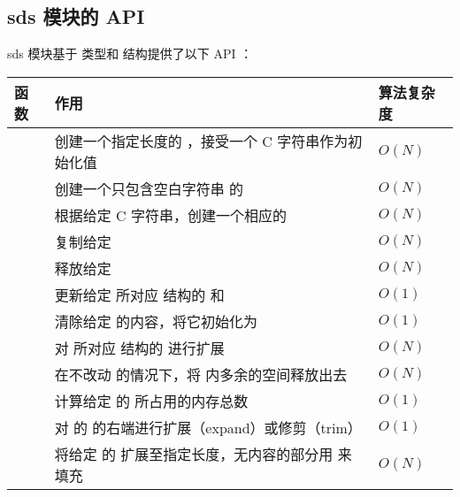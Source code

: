\documentclass[a4paper,11pt,english]{sphinxmanual}
\begin{document}
\subsection{sds 模块的 API}
\label{internal-datastruct/sds:sds-api}
sds 模块基于  类型和  结构提供了以下 API ：

\begin{tabulary}{\linewidth}{|p{3.5cm}|p{8.5cm}|p{2.5cm}|}
\hline
\textbf{
函数
} & \textbf{
作用
} & \textbf{
算法复杂度
}\\\hline

 & 
创建一个指定长度的  ，接受一个 C 字符串作为初始化值
 & 
$O(N)$
\\\hline

 & 
创建一个只包含空白字符串  的 
 & 
$O(N)$
\\\hline

 & 
根据给定 C 字符串，创建一个相应的 
 & 
$O(N)$
\\\hline

 & 
复制给定 
 & 
$O(N)$
\\\hline

 & 
释放给定 
 & 
$O(N)$
\\\hline

 & 
更新给定  所对应  结构的  和 
 & 
$O(1)$
\\\hline

 & 
清除给定  的内容，将它初始化为 
 & 
$O(1)$
\\\hline

 & 
对  所对应  结构的  进行扩展
 & 
$O(N)$
\\\hline

 & 
在不改动  的情况下，将  内多余的空间释放出去
 & 
$O(N)$
\\\hline

 & 
计算给定  的  所占用的内存总数
 & 
$O(1)$
\\\hline

 & 
对  的  的右端进行扩展（expand）或修剪（trim）
 & 
$O(1)$
\\\hline

 & 
将给定  的  扩展至指定长度，无内容的部分用  来填充
 & 
$O(N)$
\\\hline


\end{tabulary}
\end{document}
